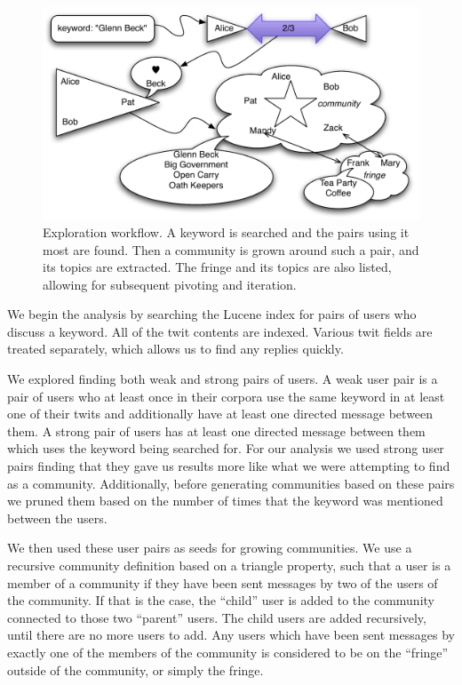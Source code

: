 \documentclass[10pt,oneside]{memoir}
\begin{document}
\begin{figure}[htp]
\begin{center}
\includegraphics[width=6in]{figures/spie-workflow}
\caption{Exploration workflow.  A keyword is searched and the pairs using it most are found.  Then a community is grown around such a pair, and its topics are extracted.  The fringe and its topics are also listed, allowing for subsequent pivoting and iteration.}
\label{figure:spie-workflow}
\end{center}
\end{figure}
We begin the analysis by searching the Lucene index for pairs of
users who discuss a keyword. All of the twit contents are indexed.
Various twit fields are treated separately, which allows us to find
any replies quickly.


We explored finding both weak and strong pairs of users. A weak
user pair is a pair of users who at least once in their corpora use
the same keyword in at least one of their twits and additionally
have at least one directed message between them. A strong pair of
users has at least one directed message between them which uses the
keyword being searched for. For our analysis we used strong user
pairs finding that they gave us results more like what we were
attempting to find as a community. Additionally, before generating
communities based on these pairs we pruned them based on the number
of times that the keyword was mentioned between the users.


We then used these user pairs as seeds for growing communities. We
use a recursive community definition based on a triangle property,
such that a user is a member of a community if they have been sent
messages by two of the users of the community. If that is the case,
the ``child'' user is added to the community connected to those two
``parent'' users. The child users are added recursively, until there
are no more users to add. Any users which have been sent messages
by exactly one of the members of the community is considered to be
on the ``fringe'' outside of the community, or simply the fringe.
\end{document}
